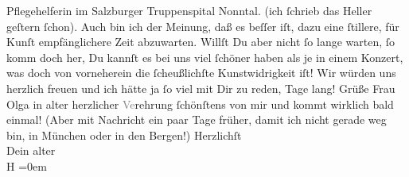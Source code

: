 \begin{ledgroupsized}[t]{13cm}
{{{                  Pflegehelferin im Salzburger Truppenspital
                     Nonntal.}}}\label{K_L02204_1h} (ich ſchrieb das Heller geſtern ſchon). Auch bin ich der Meinung, daß es beſſer iſt, dazu
               eine ſtillere, für Kunſt empfänglichere Zeit abzuwarten. Willſt Du aber nicht ſo
               lange warten, ſo komm doch her, Du kannſt es bei uns viel ſchöner haben als je in
               einem Konzert, was doch von vorneherein die ſcheußlichſte Kunstwidrigkeit iſt! Wir
               würden uns herzlich freuen und ich hätte ja ſo viel mit Dir zu reden, Tage lang!\pend
           \pstart
           Grüße Frau Olga in alter herzlicher
                  \textcolor{gray}{Ve}rehrung ſchönſtens von mir und kommt wirklich bald einmal!
               (Aber mit Nachricht ein paar Tage früher, damit ich nicht gerade weg bin, in München oder in den Bergen!)\pend
           \pstart
           Herzlichſt{\\[\baselineskip]}Dein alter{\\[\baselineskip]}\spacefill\mbox{H}\pend
           \leftskip=0em{}          \endnumbering{}\end{ledgroupsized}  \newcommand{\dateiname}{L02204}\newcommand{\titel}{Hermann Bahr an Arthur Schnitzler, 10. 2. 1915}\newcommand{\editorInnen}{ Kurt Ifkovits,  Martin Anton Müller}
            \footnotesize
\begin{ledgroupsized}[t]{11.5cm}
\end{ledgroupsized}
         
      